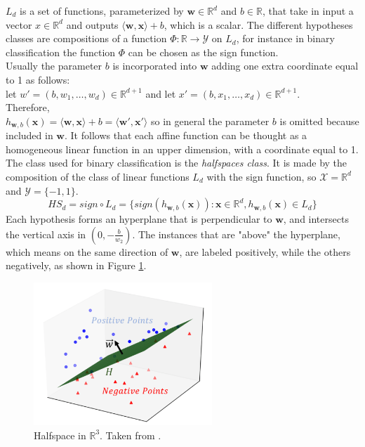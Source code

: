 $L_d$ is a set of functions, parameterized by $\mathbf{w} \in \mathbb{R}^d$ and $b \in \mathbb{R}$, that take in input a vector $x \in \mathbb{R}^d$ and outputs $\langle \textbf{w},\textbf{x} \rangle + b$, which is a scalar.
The different hypotheses classes are compositions of a function $\Phi : \mathbb{R} \rightarrow \mathcal{Y}$ on $L_d$, for instance in binary classification the function $\Phi$ can be chosen as the sign function.\\
Usually the parameter $b$ is incorporated into $\mathbf{w}$ adding one extra coordinate equal to 1 as follows:\\
let $w'=(b, w_1, \dots , w_d) \in \mathbb{R}^{d+1}$ and let $x'=(b, x_1, \dots , x_d) \in \mathbb{R}^{d+1}$.\\
Therefore, \\
$h_{\mathbf{w},b}(\mathbf{x}) = \langle \mathbf{w},\mathbf{x} \rangle + b = \langle \mathbf{w'},\mathbf{x'} \rangle$
so in general the parameter $b$ is omitted because included in $\mathbf{w}$. It follows that each affine function can be thought as a homogeneous linear function in an upper dimension, with a coordinate equal to 1.\\
The class used for binary classification is the \textit{halfspaces class}. It is made by the composition of the class of linear functions $L_d$ with the sign function, so $\mathcal{X}=\mathbb{R}^d$ and $\mathcal{Y}=\{-1,1\}$.
\[ HS_d = sign \circ L_d = \{ sign( h_{\mathbf{w},b}(\mathbf{x}) ) : \mathbf{x} \in \mathbb{R}^d, h_{\mathbf{w},b}(\mathbf{x}) \in L_d \} \]
Each hypothesis forms an hyperplane that is perpendicular to $\mathbf{w}$, and intersects the vertical axis in $(0, -\frac{b}{w_2})$. The instances that are "above" the hyperplane, which means on the same direction of $\mathbf{w}$, are labeled positively, while the others negatively, as shown in Figure \ref{fig:halfspace}.

\begin{figure}[ht]
	\centering
	\includegraphics[width=0.6\textwidth]{figures/halfspace.png}
	\caption{Halfspace in $\mathbb{R}^3$. Taken from \cite{halfspace}.}
	\label{fig:halfspace}
\end{figure}










